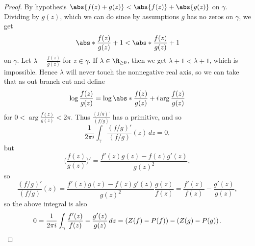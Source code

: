 \begin{proof}
	By hypothesis $\abs{f(z) + g(z)} < \abs{f(z)} + \abs{g(z)}$ on $\gamma$.
	Dividing by $g(z)$, which we can do since by assumptions $g$ has no zeros on $\gamma$, we get
	\[
		\abs*{\frac{f(z)}{g(z)} + 1} < \abs*{\frac{f(z)}{g(z)}} + 1
	\]
	on $\gamma$.
	Let $\lambda = \frac{f(z)}{g(z)}$ for $z \in \gamma$.
	If $\lambda \in \R_{\geq 0}$, then we get $\lambda + 1 < \lambda + 1$, which is impossible.
	Hence $\lambda$ will never touch the nonnegative real axis, so we can take that as out branch cut and define
	\[
		\log \frac{f(z)}{g(z)} = \log \abs*{\frac{f(z)}{g(z)}} + i \arg \frac{f(z)}{g(z)}
	\]
	for $0 < \arg \frac{f(z)}{g(z)} < 2 \pi$.
	Thus $\frac{(f / g)'}{(f / g)}$ has a primitive, and so
	\[
		\frac{1}{2 \pi i} \int_\gamma \frac{(f / g)'}{(f / g)}(z) \, d z = 0,
	\]
	but
	\[
		\biggl ( \frac{f(z)}{g(z)} \biggr )' = \frac{f'(z) g(z) - f(z) g'(z)}{g(z)^2},
	\]
	so
	\[
		\frac{(f / g)'}{(f / g)}(z) = \frac{f'(z) g(z) - f(z) g'(z)}{g(z)^2} \frac{g(z)}{f(z)} = \frac{f'(z)}{f(z)} - \frac{g'(z)}{g(z)},
	\]
	so the above integral is also
	\[
		0 = \frac{1}{2 \pi i} \int_\gamma \frac{f'(z)}{f(z)} - \frac{g'(z)}{g(z)} \, d z = \left ( Z(f) - P(f) \right ) - \left (Z(g) - P(g) \right ). \qedhere
	\]
\end{proof}
